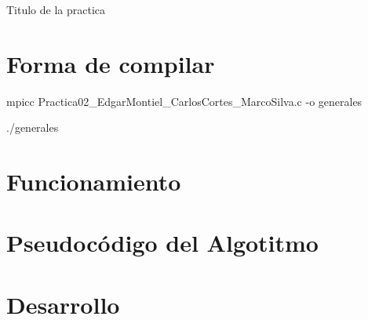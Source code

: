 \documentclass[a4paper,12pt]{article}
\begin{document}

\newpage




\newpage

\begin{center}
    {\Large Titulo de la practica}
\end{center}

\section*{Forma de compilar}
mpicc Practica02_EdgarMontiel_CarlosCortes_MarcoSilva.c -o generales


./generales 

\section*{Funcionamiento}

\section*{Pseudocódigo del Algotitmo}
    

\section*{Desarrollo}
\end{document}
